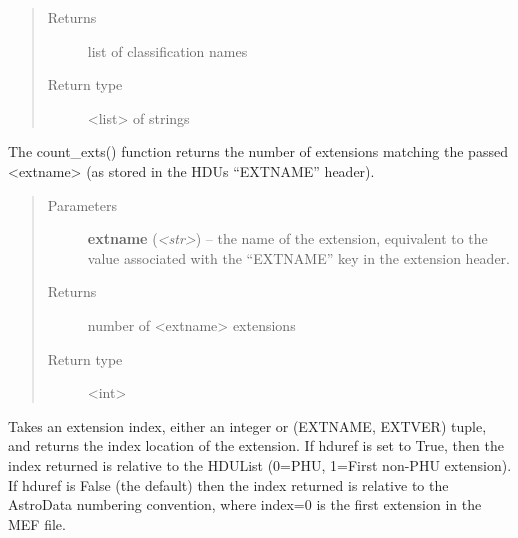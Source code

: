 \documentclass[letterpaper,10pt,english]{sphinxmanual}
\begin{document}
\begin{fulllineitems}
\begin{fulllineitems}
\begin{quote}
\begin{description}
\item[{Returns}] \leavevmode
list of classification names

\item[{Return type}] \leavevmode
\textless{}list\textgreater{} of strings

\end{description}\end{quote}

\end{fulllineitems}


\begin{fulllineitems}
\label{astro_class:astrodata.AstroData.AstroData.count_exts}
The count\_exts() function returns the number of extensions matching the
passed \textless{}extname\textgreater{} (as stored in the HDUs ``EXTNAME'' header).
\begin{quote}\begin{description}
\item[{Parameters}] \leavevmode
\textbf{extname} (\emph{\textless{}str\textgreater{}}) -- the name of the extension, equivalent to the
value associated with the ``EXTNAME'' key in the extension
header.

\item[{Returns}] \leavevmode
number of \textless{}extname\textgreater{} extensions

\item[{Return type}] \leavevmode
\textless{}int\textgreater{}

\end{description}\end{quote}

\end{fulllineitems}


\begin{fulllineitems}
\label{astro_class:astrodata.AstroData.AstroData.ext_index}
Takes an extension index, either an integer or (EXTNAME, EXTVER) 
tuple, and returns the index location of the extension.  If hduref is 
set to True, then the index returned is relative to the HDUList 
(0=PHU, 1=First non-PHU extension). If hduref is False (the default) 
then the index returned is relative to the AstroData numbering 
convention, where index=0 is the first extension in the MEF file.


\end{fulllineitems}
\end{fulllineitems}
\end{document}
